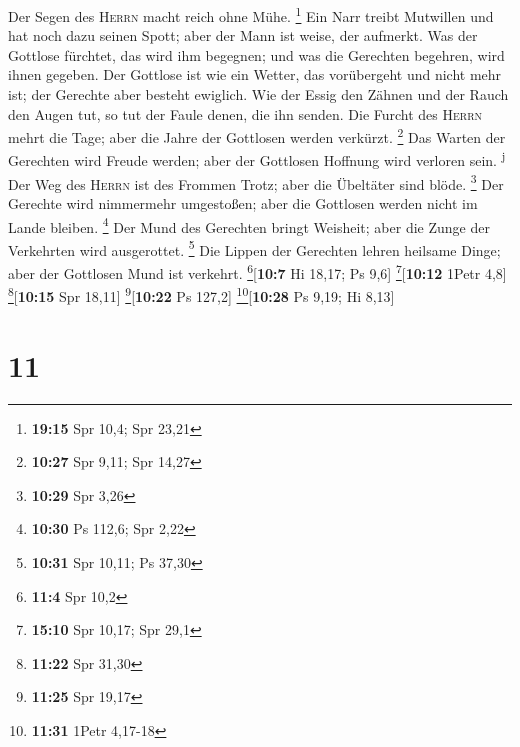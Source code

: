  Der Segen des \textsc{Herrn} macht reich ohne Mühe.
\footnote{\textbf{19:15} Spr 10,4; Spr 23,21}  Ein Narr
treibt Mutwillen und hat noch dazu seinen Spott; aber der Mann ist
weise, der aufmerkt.  Was der Gottlose fürchtet, das wird
ihm begegnen; und was die Gerechten begehren, wird ihnen gegeben.
 Der Gottlose ist wie ein Wetter, das vorübergeht und
nicht mehr ist; der Gerechte aber besteht ewiglich.  Wie
der Essig den Zähnen und der Rauch den Augen tut, so tut der Faule
denen, die ihn senden.  Die Furcht des \textsc{Herrn}
mehrt die Tage; aber die Jahre der Gottlosen werden verkürzt.
\footnote{\textbf{10:27} Spr 9,11; Spr 14,27}  Das Warten
der Gerechten wird Freude werden; aber der Gottlosen Hoffnung wird
verloren sein. \textsuperscript{j}  Der Weg des
\textsc{Herrn} ist des Frommen Trotz; aber die Übeltäter sind blöde.
\footnote{\textbf{10:29} Spr 3,26}  Der Gerechte wird
nimmermehr umgestoßen; aber die Gottlosen werden nicht im Lande bleiben.
\footnote{\textbf{10:30} Ps 112,6; Spr 2,22}  Der Mund
des Gerechten bringt Weisheit; aber die Zunge der Verkehrten wird
ausgerottet. \footnote{\textbf{10:31} Spr 10,11; Ps 37,30}
 Die Lippen der Gerechten lehren heilsame Dinge; aber der
Gottlosen Mund ist verkehrt. \footnote{\textbf{11:4} Spr 10,2}{[}\textbf{10:7}
Hi 18,17; Ps 9,6{]} \footnote{\textbf{15:10} Spr 10,17; Spr 29,1}{[}\textbf{10:12}
1Petr 4,8{]} \footnote{\textbf{11:22} Spr 31,30}{[}\textbf{10:15} Spr
18,11{]} \footnote{\textbf{11:25} Spr 19,17}{[}\textbf{10:22} Ps
127,2{]} \footnote{\textbf{11:31} 1Petr 4,17-18}{[}\textbf{10:28} Ps
9,19; Hi 8,13{]}

\hypertarget{section-10}{%
\section{11}\label{section-10}}

